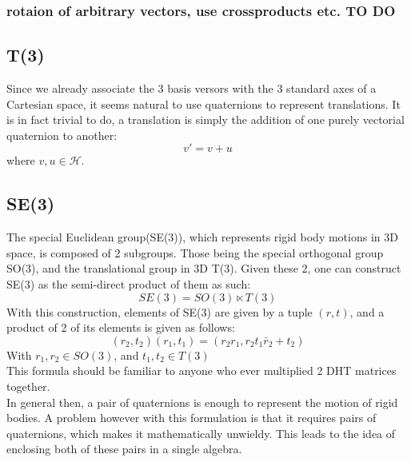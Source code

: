 \subsubsection{rotaion of arbitrary vectors, use crossproducts etc. TO DO}

\subsection{T(3)}

Since we already associate the 3 basis versors with the 3 standard axes of a Cartesian space, it seems natural to use quaternions to represent translations. It is in fact trivial to do, a translation is simply the addition of one purely vectorial quaternion to another:
\begin{equation}
    v' = v + u
\end{equation}
where $v,u\in \mathcal{H}$.
\clearpage
\subsection{SE(3)}
The special Euclidean group(SE(3)), which represents rigid body motions in 3D space, is composed of 2 subgroups. Those being the special orthogonal group SO(3), and the translational group in 3D T(3). Given these 2, one can construct SE(3) as the semi-direct product of them as such:
\begin{equation}
    SE(3) = SO(3)\ltimes T(3)
\end{equation}
With this construction, elements of SE(3) are given by a tuple  $(r,t)$, and a product of 2 of its elements is given as follows:
 \begin{equation}
     \label{semidirect}
     (r_2,t_2)(r_1,t_1) = (r_2r_1,r_2t_1\bar{r}_2+t_2)
\end{equation}
With $r_1,r_2\in SO(3)$, and $t_1,t_2 \in T(3)$\\
This formula should be familiar to anyone who ever multiplied 2 DHT matrices together.\\
In general then, a pair of quaternions is enough to represent the motion of rigid bodies. A problem however with this formulation is that it requires pairs of quaternions, which makes it mathematically unwieldy. This leads to the idea of enclosing both of these pairs in a single algebra.
